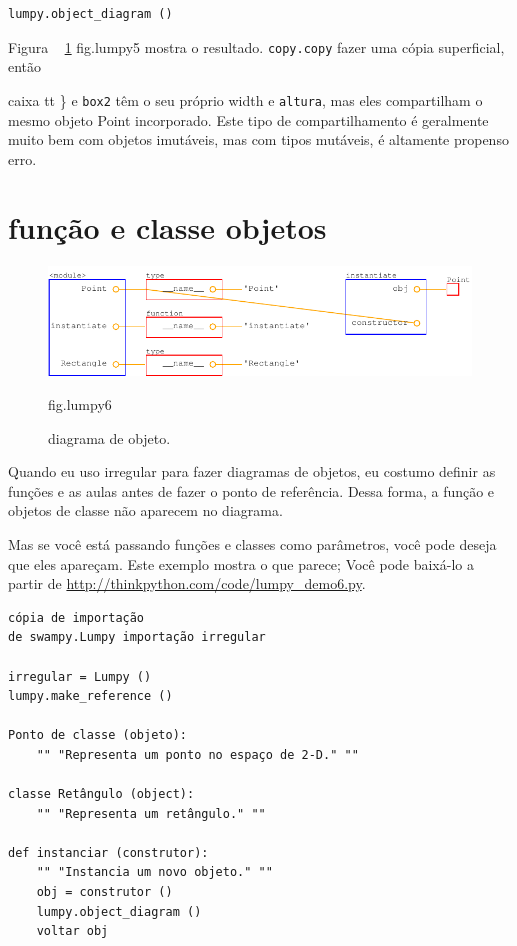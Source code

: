 \documentclass[10pt]{book}
\begin{document}
\begin{v erbatim}
\begin{verbatim}
lumpy.object_diagram ()
\end{verbatim}

Figura ~ \ref {} fig.lumpy5 mostra o resultado. {\tt copy.copy} fazer uma
cópia superficial, então {caixa tt \} e {\tt box2} têm o seu próprio {width \tt}
e {\tt altura}, mas eles compartilham o mesmo objeto Point incorporado. Este
tipo de compartilhamento é geralmente muito bem com objetos imutáveis, mas com
tipos mutáveis, é altamente propenso erro.

\section{função e classe objetos}

\begin{figure}
\centerline
{\includegraphics[scale = 0.7] {figs/lumpydemo6.pdf}}
\caption{diagrama de objeto.}
\label{} fig.lumpy6
\end{figure}

Quando eu uso irregular para fazer diagramas de objetos, eu costumo definir as funções
e as aulas antes de fazer o ponto de referência. Dessa forma, a função
e objetos de classe não aparecem no diagrama.

Mas se você está passando funções e classes como parâmetros, você pode
deseja que eles apareçam. Este exemplo mostra o que parece;
Você pode baixá-lo a partir de
\url{http://thinkpython.com/code/lumpy_demo6.py}.

\begin{verbatim}
cópia de importação
de swampy.Lumpy importação irregular

irregular = Lumpy ()
lumpy.make_reference ()

Ponto de classe (objeto):
    "" "Representa um ponto no espaço de 2-D." ""

classe Retângulo (object):
    "" "Representa um retângulo." ""

def instanciar (construtor):
    "" "Instancia um novo objeto." ""
    obj = construtor ()
    lumpy.object_diagram ()
    voltar obj


\end{verbatim}}
\end{v erbatim}
\end{document}
